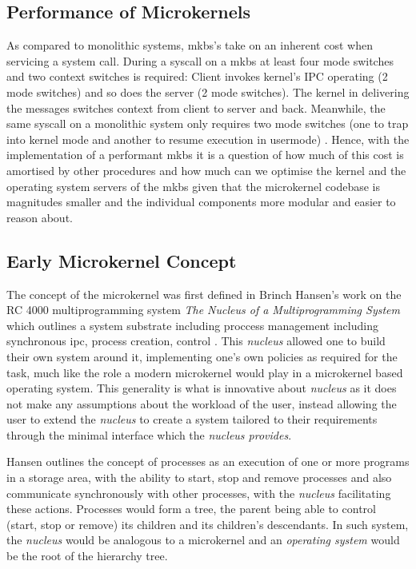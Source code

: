 \documentclass[../thesis.tex]{subfiles}
\begin{document}
\subsection{Performance of Microkernels}
As compared to monolithic systems, \gls{mkbs}'s take on an inherent cost when servicing a system call. During a syscall on a \gls{mkbs} at least four mode switches and two context switches is required: Client invokes kernel's IPC operating (2 mode switches) and so does the server (2 mode switches). The kernel in delivering the messages switches context from client to server and back. Meanwhile, the same syscall on a monolithic system only requires two mode switches (one to trap into kernel mode and another to resume execution in usermode) \citep{Biggs_LH_18}. Hence, with the implementation of a performant \gls{mkbs} it is a question of how much of this cost is amortised by other procedures and how much can we optimise the kernel and the operating system servers of the \gls{mkbs} given that the microkernel codebase is magnitudes smaller and the individual components more modular and easier to reason about.

\subsection{Early Microkernel Concept} 
The concept of the microkernel was first defined in Brinch Hansen's work on the RC 4000 multiprogramming system \textit{The Nucleus of a Multiprogramming System} which outlines a system substrate including proccess management including synchronous \gls{ipc}, process creation, control \citep{Brinch_Hansen_70}. This \textit{nucleus} allowed one to build their own system around it, implementing one's own policies as required for the task, much like the role a modern microkernel would play in a microkernel based operating system. This generality is what is innovative about \textit{nucleus} as it does not make any assumptions about the workload of the user, instead allowing the user to extend the \textit{nucleus} to create a system tailored to their requirements through the minimal interface which the \textit{nucleus provides}.

Hansen outlines the concept of processes as an execution of one or more programs in a storage area, with the ability to start, stop and remove processes and also communicate synchronously with other processes, with the \textit{nucleus} facilitating these actions. Processes would form a tree, the parent being able to control (start, stop or remove) its children and its children's descendants. In such system, the \textit{nucleus} would be analogous to a microkernel and an \textit{operating system} would be the root of the hierarchy tree.
\end{document}
